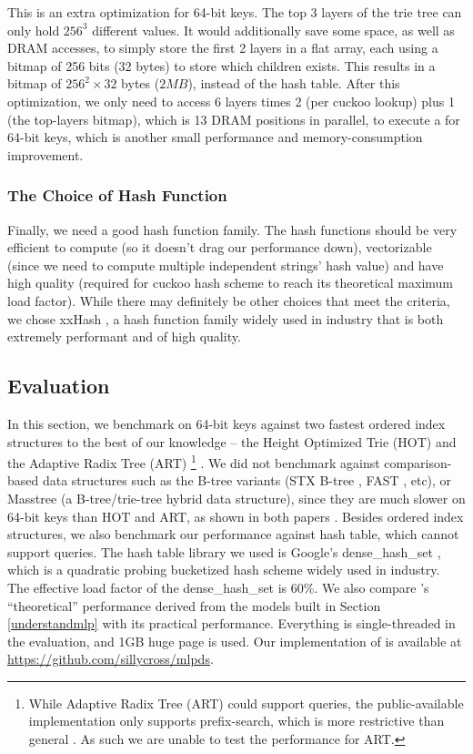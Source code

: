 \documentclass[11pt, usletter]{article}
\begin{document}
This is an extra optimization for 64-bit keys.
The top 3 layers of the trie tree can only hold $256^3$ different values. 
It would additionally save some space, as well as DRAM accesses, to simply store the first 2 layers
in a flat array, each using a bitmap of 256 bits (32 bytes) to store which children exists. 
This results in a bitmap of $256^2\times 32$ bytes ($2MB$), instead of the hash table. 
After this optimization, we only need to access 6 layers times 2 (per cuckoo lookup) plus 1 (the top-layers bitmap), 
which is 13 DRAM positions in parallel, to execute a \QueryLCP for 64-bit keys, 
which is another small performance and memory-consumption improvement.
 
\subsubsection*{The Choice of Hash Function}

Finally, we need a good hash function family.
The hash functions should be very efficient to compute (so it doesn't drag our performance down), 
vectorizable (since we need to compute multiple independent strings' hash value) 
and have high quality (required for cuckoo hash scheme to reach its theoretical maximum load factor).
While there may definitely be other choices that meet the criteria, 
we chose xxHash \cite{xxhash}, 
a hash function family widely used in industry that is both extremely performant and of high quality.

\subsection{Evaluation} \label{mlpindex_eval}

In this section, we benchmark \MlpIndex on 64-bit keys against two fastest ordered index 
structures to the best of our knowledge -- the Height Optimized Trie (HOT) \cite{hot_sigmod18} and the Adaptive Radix Tree (ART) 
\footnote{While Adaptive Radix Tree (ART) could support \lowerbound queries, 
the public-available implementation only supports prefix-search, 
which is more restrictive than general \lowerbound. 
As such we are unable to test the \lowerbound performance for ART.} \cite{arttrie_icde13}.
We did not benchmark against comparison-based data structures such as the B-tree variants 
(STX B-tree \cite{stx_btree}, FAST \cite{fast_sigmod10}, etc), 
or Masstree \cite{masstree} (a B-tree/trie-tree hybrid data structure),
since they are much slower on 64-bit keys than HOT and ART, as shown in both papers \cite{hot_sigmod18, arttrie_icde13}.
Besides ordered index structures, we also benchmark our performance against hash table, which cannot support \lowerbound queries. 
The hash table library we used is Google's dense\_hash\_set \cite{densehashset},
which is a quadratic probing bucketized hash scheme widely used in industry.
The effective load factor of the dense\_hash\_set is 60\%.
We also compare \MlpIndex's ``theoretical'' performance derived from the models built in Section \ref{understandmlp} 
with its practical performance. Everything is single-threaded in the evaluation, and 1GB huge page is used. 
Our implementation of \MlpIndex is available at \url{https://github.com/sillycross/mlpds}.
\end{document}
